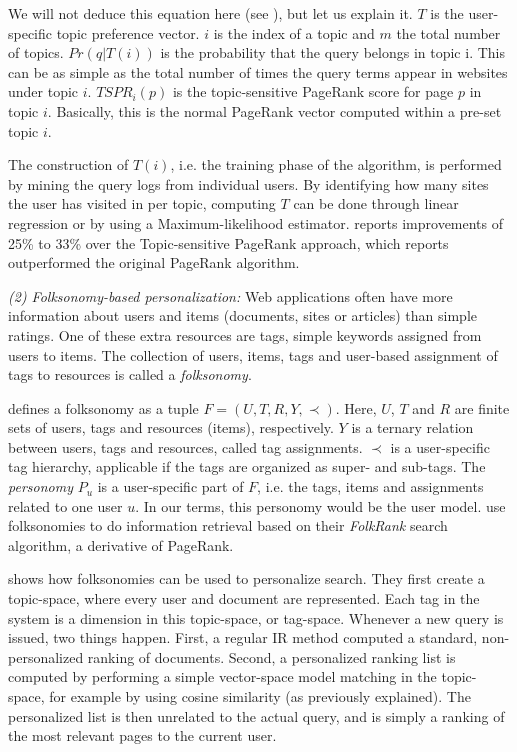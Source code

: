 We will not deduce this equation here (see \citet[p.5]{Qiu2006}), but let us explain it. 
$T$ is the user-specific topic preference vector.
$i$ is the index of a topic and $m$ the total number of topics.
$Pr(q|T(i))$ is the probability that the query belongs in topic i.
This can be as simple as the total number of times the query terms appear in websites under topic $i$.
$TSPR_i(p)$ is the topic-sensitive PageRank score for page $p$ in topic $i$. Basically, this is 
the normal PageRank vector computed within a pre-set topic $i$.

The construction of $T(i)$, i.e. the training phase of the algorithm, is performed by mining the query logs from individual users.
By identifying how many sites the user has visited in per topic, computing $T$ can be done through linear regression or
by using a Maximum-likelihood estimator.
\citet[p.10]{Qiu2006} reports improvements of 25\% to 33\% over the Topic-sensitive PageRank approach, which 
\citet{Haveliwala2003} reports outperformed the original PageRank algorithm.


\emph{(2) Folksonomy-based personalization:}
Web applications often have more information about users and items (documents, sites or articles) 
than simple ratings. One of these extra resources are tags, simple keywords assigned from users to items. 
The collection of users, items, tags and user-based assignment of tags to resources is called a \emph{folksonomy}.

\cite{Hotho} defines a folksonomy as a tuple $F = (U,T,R,Y,\prec)$. 
Here, $U$, $T$ and $R$ are finite sets of users, tags and resources (items), respectively. 
$Y$ is a ternary relation between users, tags and resources, called tag assignments. 
$\prec$ is a user-specific tag hierarchy, applicable if the tags are organized as super- and sub-tags. 
The \emph{personomy} $P_u$ is a user-specific part of $F$, 
i.e. the tags, items and assignments related to one user $u$. 
In our terms, this personomy would be the user model. 
\citeauthor{Hotho} use folksonomies to do information retrieval based on their 
\emph{FolkRank} search algorithm, a derivative of PageRank. 

\cite{Bao2007} shows how folksonomies can be used to personalize search.
They first create a topic-space, where every user and document are represented.
Each tag in the system is a dimension in this topic-space, or tag-space.
Whenever a new query is issued, two things happen. First, a regular IR method
computed a standard, non-personalized ranking of documents.
Second, a personalized ranking list is computed by performing a simple
vector-space model matching in the topic-space, for example by using
cosine similarity (as previously explained). The personalized list
is then unrelated to the actual query, and is simply a ranking of the
most relevant pages to the current user.

